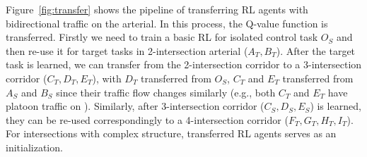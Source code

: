 Figure~\ref{fig:transfer} shows the pipeline of transferring RL agents with bidirectional traffic on the arterial. In this process, the Q-value function is transferred. Firstly we need to train a basic RL for isolated control task $O_S$ and then re-use it for target tasks in 2-intersection arterial ($A_T, B_T$). After the target task is learned, we can 
transfer from the 2-intersection corridor to a 3-intersection corridor ($C_T, D_T, E_T$), with $D_T$  transferred from $O_S$, $C_T$ and $E_T$ transferred from $A_S$ and $B_S$ since their traffic flow changes similarly (e.g., both $C_T$ and $E_T$ have platoon traffic on \WE). Similarly, after 3-intersection corridor ($C_S, D_S, E_S$) is learned, they can be re-used correspondingly to a 4-intersection corridor ($F_T, G_T, H_T, I_T$). For intersections with complex structure, transferred RL agents serves as an initialization.







